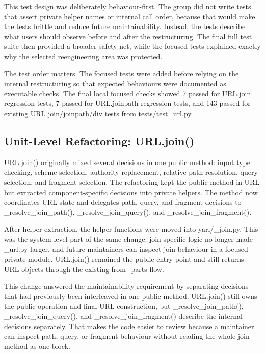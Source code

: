 \documentclass[11pt,a4paper]{article}
\begin{document}
This test design was deliberately behaviour-first. The group did not write tests that assert private helper names or internal call order, because that would make the tests brittle and reduce future maintainability. Instead, the tests describe what users should observe before and after the restructuring. The final full test suite then provided a broader safety net, while the focused tests explained exactly why the selected reengineering area was protected.


The test order matters. The focused tests were added before relying on the internal restructuring so that expected behaviours were documented as executable checks. The final local focused checks showed 7 passed for URL.join regression tests, 7 passed for URL.joinpath regression tests, and 143 passed for existing URL join/joinpath/div tests from tests/test\_url.py.


\subsection*{Unit-Level Refactoring: URL.join()}


URL.join() originally mixed several decisions in one public method: input type checking, scheme selection, authority replacement, relative-path resolution, query selection, and fragment selection. The refactoring kept the public method in URL but extracted component-specific decisions into private helpers. The method now coordinates URL state and delegates path, query, and fragment decisions to \_resolve\_join\_path(), \_resolve\_join\_query(), and \_resolve\_join\_fragment().


After helper extraction, the helper functions were moved into yarl/\_join.py. This was the system-level part of the same change: join-specific logic no longer made \_url.py larger, and future maintainers can inspect join behaviour in a focused private module. URL.join() remained the public entry point and still returns URL objects through the existing from\_parts flow.


This change answered the maintainability requirement by separating decisions that had previously been interleaved in one public method. URL.join() still owns the public operation and final URL construction, but \_resolve\_join\_path(), \_resolve\_join\_query(), and \_resolve\_join\_fragment() describe the internal decisions separately. That makes the code easier to review because a maintainer can inspect path, query, or fragment behaviour without reading the whole join method as one block.
\end{document}
